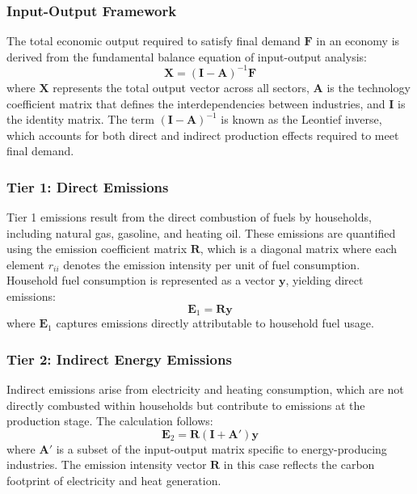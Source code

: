 \documentclass[12pt,a4paper]{article}%
\begin{document}
\subsubsection*{Input-Output Framework}
The total economic output required to satisfy final demand \( \mathbf{F} \) in an economy is derived from the fundamental balance equation of input-output analysis:
\begin{equation}
    \mathbf{X} = (\mathbf{I} - \mathbf{A})^{-1} \mathbf{F}
\end{equation}
where \( \mathbf{X} \) represents the total output vector across all sectors, \( \mathbf{A} \) is the technology coefficient matrix that defines the interdependencies between industries, and \( \mathbf{I} \) is the identity matrix. The term \( (\mathbf{I} - \mathbf{A})^{-1} \) is known as the Leontief inverse, which accounts for both direct and indirect production effects required to meet final demand.

\subsubsection*{Tier 1: Direct Emissions}
Tier 1 emissions result from the direct combustion of fuels by households, including natural gas, gasoline, and heating oil. These emissions are quantified using the emission coefficient matrix \( \mathbf{R} \), which is a diagonal matrix where each element \( r_{ii} \) denotes the emission intensity per unit of fuel consumption. Household fuel consumption is represented as a vector \( \mathbf{y} \), yielding direct emissions:
\begin{equation}
    \mathbf{E}_1 = \mathbf{R} \mathbf{y}
\end{equation}
where \( \mathbf{E}_1 \) captures emissions directly attributable to household fuel usage.

\subsubsection*{Tier 2: Indirect Energy Emissions}
Indirect emissions arise from electricity and heating consumption, which are not directly combusted within households but contribute to emissions at the production stage. The calculation follows:
\begin{equation}
    \mathbf{E}_2 = \mathbf{R} (\mathbf{I} + \mathbf{A}') \mathbf{y}
\end{equation}
where \( \mathbf{A}' \) is a subset of the input-output matrix specific to energy-producing industries. The emission intensity vector \( \mathbf{R} \) in this case reflects the carbon footprint of electricity and heat generation.
\end{document}
